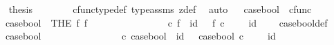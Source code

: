 \begin{isabellebody}
\ \isamarkupfalse%
\ {\isacharquery}{\kern0pt}thesis\isanewline
\ \ \ \ \ \ \isamarkupfalse%
\ cfunc{\isacharunderscore}{\kern0pt}type{\isacharunderscore}{\kern0pt}def\ type{\isacharunderscore}{\kern0pt}assms{\isacharparenleft}{\kern0pt}{}{\isacharparenright}{\kern0pt}\ z{\isacharunderscore}{\kern0pt}def\ \isamarkupfalse%
\ auto\isanewline
\ \isamarkupfalse%
\isanewline
{}\isamarkupfalse%
%
\endisatagproof
{\isafoldproof}%
%
\isadelimproof
%
\endisadelimproof
%
\isadelimdocument
%
\endisadelimdocument
%
\isatagdocument
%
\isamarkuptrue%
%
\endisatagdocument
{\isafolddocument}%
%
\isadelimdocument
%
\endisadelimdocument
{}\isamarkupfalse%
\ case{\isacharunderscore}{\kern0pt}bool\ {\isacharcolon}{\kern0pt}{\isacharcolon}{\kern0pt}\ {\isachardoublequoteopen}cfunc{\isachardoublequoteclose}\ \isanewline
\ \ {\isachardoublequoteopen}case{\isacharunderscore}{\kern0pt}bool\ {\isacharequal}{\kern0pt}\ {\isacharparenleft}{\kern0pt}THE\ f{\isachardot}{\kern0pt}\ f\ {\isacharcolon}{\kern0pt}\ {\isasymOmega}\ {\isasymrightarrow}\ {\isacharparenleft}{\kern0pt}{\isasymone}\ {\isasymCoprod}\ {\isasymone}{\isacharparenright}{\kern0pt}\ {\isasymand}\ \ \isanewline
\ \ \ \ {\isacharparenleft}{\kern0pt}{\isasymt}\ {\isasymamalg}\ {\isasymf}{\isacharparenright}{\kern0pt}\ {\isasymcirc}\isactrlsub c\ f\ {\isacharequal}{\kern0pt}\ id\ {\isasymOmega}\ {\isasymand}\ f\ {\isasymcirc}\isactrlsub c\ {\isacharparenleft}{\kern0pt}{\isasymt}\ {\isasymamalg}\ {\isasymf}{\isacharparenright}{\kern0pt}\ {\isacharequal}{\kern0pt}\ id\ {\isacharparenleft}{\kern0pt}{\isasymone}\ {\isasymCoprod}\ {\isasymone}{\isacharparenright}{\kern0pt}{\isacharparenright}{\kern0pt}{\isachardoublequoteclose}\isanewline
\isanewline
{}\isamarkupfalse%
\ case{\isacharunderscore}{\kern0pt}bool{\isacharunderscore}{\kern0pt}def{}{\isacharcolon}{\kern0pt}\isanewline
\ \ {\isachardoublequoteopen}case{\isacharunderscore}{\kern0pt}bool\ {\isacharcolon}{\kern0pt}\ {\isasymOmega}\ {\isasymrightarrow}\ {\isacharparenleft}{\kern0pt}{\isasymone}\ {\isasymCoprod}\ {\isasymone}{\isacharparenright}{\kern0pt}\ {\isasymand}\ \ \isanewline
\ \ \ \ {\isacharparenleft}{\kern0pt}{\isasymt}\ {\isasymamalg}\ {\isasymf}{\isacharparenright}{\kern0pt}\ {\isasymcirc}\isactrlsub c\ case{\isacharunderscore}{\kern0pt}bool\ {\isacharequal}{\kern0pt}\ id\ {\isasymOmega}\ {\isasymand}\ case{\isacharunderscore}{\kern0pt}bool\ {\isasymcirc}\isactrlsub c\ {\isacharparenleft}{\kern0pt}{\isasymt}\ {\isasymamalg}\ {\isasymf}{\isacharparenright}{\kern0pt}\ {\isacharequal}{\kern0pt}\ id\ {\isacharparenleft}{\kern0pt}{\isasymone}\ {\isasymCoprod}\ {\isasymone}{\isacharparenright}{\kern0pt}{\isachardoublequoteclose}\isanewline

\end{isabellebody}
